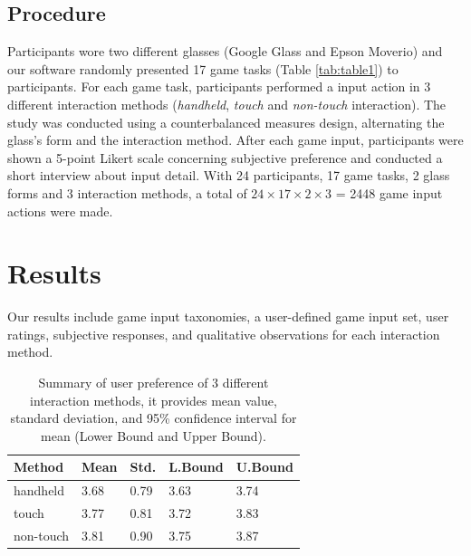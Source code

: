 \documentclass{sigchi}
\newcommand\tabhead[1]{\small\textbf{#1}}
\begin{document}
  

    \subsection {Procedure}
    Participants wore two different glasses (Google Glass and Epson Moverio) and our software randomly presented 17 game tasks (Table \ref{tab:table1}) to participants. For each game task, participants performed a input action in 3 different interaction methods (\emph{handheld}, \emph{touch} and \emph{non-touch} interaction). The study was conducted using a counterbalanced measures design, alternating the glass's form and the interaction method. After each game input, participants were shown a 5-point Likert scale concerning subjective preference and conducted a short interview about input detail. With 24 participants, 17 game tasks, 2 glass forms and 3 interaction methods, a total of $24 \times 17 \times 2 \times 3$ = 2448 game input actions were made. 


\section{Results}

Our results include game input taxonomies, a user-defined game input set, user ratings, subjective responses, and qualitative observations for each interaction method.

  \begin{table}
    \centering
    \begin{tabular}{|l|l|l|l|l|}
      \hline
      \tabhead{Method} &
      \multicolumn{1}{|p{0.13\columnwidth}|}{\centering\tabhead{Mean}} &
      \multicolumn{1}{|p{0.13\columnwidth}|}{\centering\tabhead{Std.}} &
      \multicolumn{1}{|p{0.13\columnwidth}|}{\centering\tabhead{L.Bound}} &
      \multicolumn{1}{|p{0.13\columnwidth}|}{\centering\tabhead{U.Bound}} \\
      \hline
      handheld & 3.68 & 0.79 & 3.63 & 3.74\\
      \hline
      touch & 3.77 & 0.81 & 3.72 & 3.83\\
      \hline
      non-touch & 3.81 & 0.90 & 3.75 & 3.87\\
      \hline

    

    \end{tabular}
    \caption{Summary of user preference of 3 different interaction methods, it provides mean value, standard deviation, and 95\% confidence interval for mean (Lower Bound and Upper Bound).}
    \label{tab:tablePreferenceInteractionMethod}
  \end{table}
\end{document}

